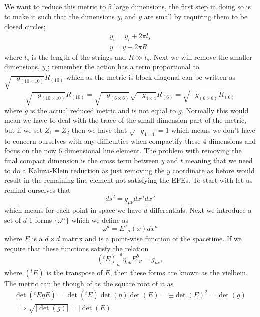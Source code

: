 \documentclass[12pt]{article}
\numberwithin{equation}{section}
\numberwithin{figure}{section}
\begin{document}
We want to reduce this metric to 5 large dimensions, the first step in doing so is to make it such that the dimensions $y_{i}$ and $y$ are small by requiring them to be closed circles;
\begin{align}
	y_{i}=y_{i}+2\pi l_{s}\\
	y=y+2 \pi R
\end{align}
where $l_{s}$ is the length of the strings and $R \gg l_{s}$.
Next we will remove the smaller dimensions, $y_{i}$; remember the action has a term proportional to $\sqrt{-g_{(10\times10)}}R_{(10)}$ which as the metric is block diagonal can be written as
\begin{equation}
	\sqrt{-g_{(10\times10)}}R_{(10)}=\sqrt{-g_{(6\times6)}}\sqrt{-g_{4\times4}}R_{(6)}=\sqrt{-\tilde{g}_{(6\times6)}}R_{(6)}
\end{equation}
where $\tilde{g}$ is the actual reduced metric and is not equal to $g$. Normally this would mean we have to deal with the trace of the small dimension part of the metric, but if we set $Z_{1}=Z_{2}$ then we have that $\sqrt{-g_{4\times4}}=1$ which means we don't have to concern ourselves with any difficulties when compactify these 4 dimensions and focus on the now 6 dimensional line element. The problem with removing the final compact dimension is the cross term between $y$ and $t$ meaning that we need to do a Kaluza-Klein reduction as just removing the $y$ coordinate as before would result in the remaining line element not satisfying the EFEs. To start with let us remind ourselves that
\begin{equation}
	ds^{2}=g_{\mu\nu}dx^{\mu}dx^{\nu}
\end{equation}
which means for each point in space we have $d$-differentials. Next we introduce a set of $d$ 1-forms $\{\omega^{\alpha}\}$ which we define as
\begin{equation}
	\omega^{a}={E^{a}}_{\mu}(x)dx^{\mu}
\end{equation}
where $E$ is a $d\times d$ matrix and is a point-wise function of the spacetime. If we require that these functions satisfy the relation
\begin{equation}
	{(^{t}E)_{\mu}}^{a}\eta_{ab}{E^{b}}_{\nu}=g_{\mu\nu},
\end{equation}
where $(^{t}E)$ is the transpose of $E$, then these forms are known as the vielbein. The metric can be though of as the square root of it as
\begin{align}
	\det(^{t}E\eta E)=\det(^{t}E)\det(\eta)\det(E)=\pm \det(E)^{2}=\det(g)\\
	\implies \sqrt{|\det(g)|}=|\det(E)|
\end{align}
\end{document}
